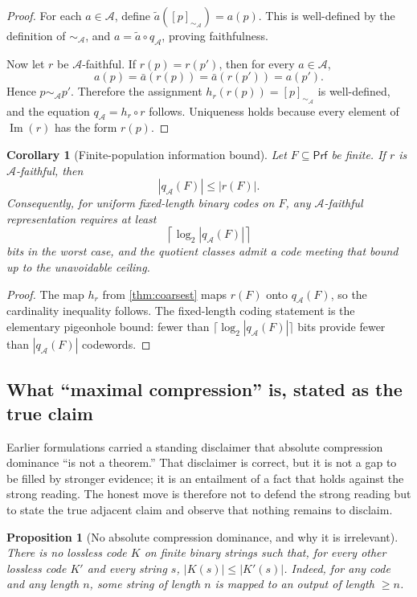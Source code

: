 \documentclass[11pt]{article}
\newcommand{\Prf}{\mathsf{Prf}}
\newcommand{\Img}{\operatorname{Im}}
\newcommand{\eqA}{\mathrel{\sim_{\mathcal A}}}
\newcommand{\qA}{q_{\mathcal A}}
\newcommand{\mcA}{\mathcal A}
\theoremstyle{plain}
\newtheorem{proposition}[theorem]{Proposition}
\newtheorem{corollary}[theorem]{Corollary}
\theoremstyle{definition}
\theoremstyle{remark}
\begin{document}
\begin{proof}
For each $a\in\mcA$, define $\tilde a([p]_{\eqA})=a(p)$.  This is well-defined by the definition of $\eqA$, and $a=\tilde a\circ\qA$, proving faithfulness.

Now let $r$ be $\mcA$-faithful.  If $r(p)=r(p')$, then for every $a\in\mcA$,
\[
  a(p)=\bar a(r(p))=\bar a(r(p'))=a(p').
\]
Hence $p\eqA p'$.  Therefore the assignment $h_r(r(p))=[p]_{\eqA}$ is well-defined, and the equation $\qA=h_r\circ r$ follows.  Uniqueness holds because every element of $\Img(r)$ has the form $r(p)$.
\end{proof}

\begin{corollary}[Finite-population information bound]
\label{cor:info-bound}
Let $F\subseteq\Prf$ be finite.  If $r$ is $\mcA$-faithful, then
\[
  |\qA(F)|\leq |r(F)|.
\]
Consequently, for uniform fixed-length binary codes on $F$, any $\mcA$-faithful representation requires at least
\[
  \left\lceil\log_2|\qA(F)|\right\rceil
\]
bits in the worst case, and the quotient classes admit a code meeting that bound up to the unavoidable ceiling.
\end{corollary}

\begin{proof}
The map $h_r$ from \cref{thm:coarsest} maps $r(F)$ onto $\qA(F)$, so the cardinality inequality follows.  The fixed-length coding statement is the elementary pigeonhole bound: fewer than $\lceil\log_2 |\qA(F)|\rceil$ bits provide fewer than $|\qA(F)|$ codewords.
\end{proof}

\subsection{What ``maximal compression'' is, stated as the true claim}
\label{sec:compression-true}

Earlier formulations carried a standing disclaimer that absolute compression dominance ``is not a theorem.''  That disclaimer is correct, but it is not a gap to be filled by stronger evidence; it is an entailment of a fact that holds against the strong reading.  The honest move is therefore not to defend the strong reading but to state the true adjacent claim and observe that nothing remains to disclaim.

\begin{proposition}[No absolute compression dominance, and why it is irrelevant]
\label{prop:no-abs}
There is no lossless code $K$ on finite binary strings such that, for every other lossless code $K'$ and every string $s$, $|K(s)|\le|K'(s)|$.  Indeed, for any code and any length $n$, some string of length $n$ is mapped to an output of length $\ge n$.
\end{proposition}
\end{document}
